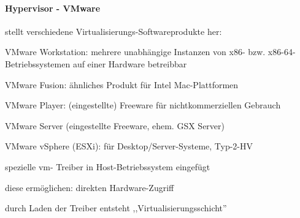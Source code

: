 \documentclass[a4paper]{article}
\begin{document}
\begin{multicols}{3}
    \paragraph{Hypervisor - VMware}
    \begin{itemize*}
        \item stellt verschiedene Virtualisierungs-Softwareprodukte her:
        \begin{itemize*}
            \item VMware Workstation:  mehrere unabhängige Instanzen von x86- bzw. x86-64-Betriebssystemen auf einer Hardware betreibbar
            \item VMware Fusion: ähnliches Produkt für Intel Mac-Plattformen
            \item VMware Player: (eingestellte) Freeware für nichtkommerziellen Gebrauch
            \item VMware Server (eingestellte Freeware, ehem. GSX Server)
            \item VMware vSphere (ESXi): für Desktop/Server-Systeme, Typ-2-HV
        \end{itemize*}
        \item spezielle vm- Treiber in Host-Betriebssystem eingefügt
        \item diese ermöglichen: direkten Hardware-Zugriff
        \item durch Laden der Treiber entsteht ,,Virtualisierungsschicht''
    \end{itemize*}


\end{multicols}
\end{document}
